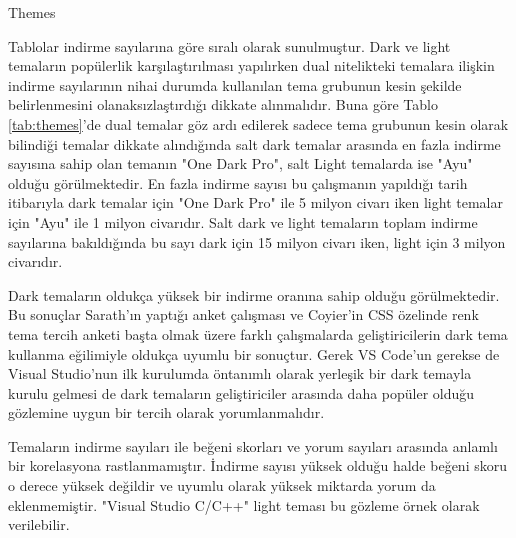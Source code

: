 \documentclass{article}
\begin{document}

\begin{table}[H]

  \caption{Themes}
  \label{tab:themes}
\end{table}

Tablolar indirme sayılarına göre sıralı olarak sunulmuştur.  Dark ve light temaların popülerlik karşılaştırılması
yapılırken dual nitelikteki temalara ilişkin indirme sayılarının nihai durumda kullanılan tema grubunun kesin şekilde
belirlenmesini olanaksızlaştırdığı dikkate alınmalıdır.  Buna göre Tablo \ref{tab:themes}'de dual temalar göz ardı
edilerek sadece tema grubunun kesin olarak bilindiği temalar dikkate alındığında salt dark temalar arasında en fazla indirme
sayısına sahip olan temanın "One Dark Pro", salt Light temalarda ise "Ayu" olduğu görülmektedir. En fazla indirme sayısı bu
çalışmanın yapıldığı tarih itibarıyla dark temalar için "One Dark Pro" ile 5 milyon civarı iken light temalar için "Ayu"
ile 1 milyon civarıdır. Salt dark ve light temaların toplam indirme sayılarına bakıldığında bu sayı dark için 15 milyon
civarı iken, light için 3 milyon civarıdır.

Dark temaların oldukça yüksek bir indirme oranına sahip olduğu görülmektedir. Bu sonuçlar Sarath'ın yaptığı anket
çalışması \cite{sarath2016prefer} ve Coyier'in CSS özelinde renk tema tercih anketi \cite{coyier2013poll} başta olmak
üzere farklı çalışmalarda geliştiricilerin dark tema kullanma eğilimiyle oldukça uyumlu bir sonuçtur.  Gerek VS Code'un
gerekse de Visual Studio'nun ilk kurulumda öntanımlı olarak yerleşik bir dark temayla kurulu gelmesi de dark temaların
geliştiriciler arasında daha popüler olduğu gözlemine uygun bir tercih olarak yorumlanmalıdır.

Temaların indirme sayıları ile beğeni skorları ve yorum sayıları arasında anlamlı bir korelasyona rastlanmamıştır.
İndirme sayısı yüksek olduğu halde beğeni skoru o derece yüksek değildir ve uyumlu olarak yüksek miktarda yorum da
eklenmemiştir. "Visual Studio C/C++" light teması bu gözleme örnek olarak verilebilir.
\end{document}
